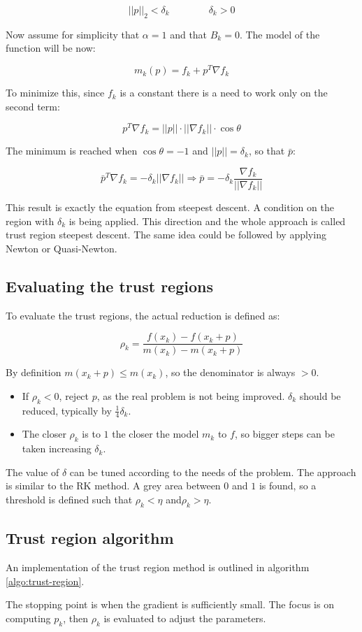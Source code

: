   $$||p||_2<\delta_k\qquad\qquad \delta_k > 0$$

  Now assume for simplicity that $\alpha = 1$ and that $B_k = 0$.
  The model of the function will be now:

  $$m_k(p) = f_k + p^T\nabla f_k$$

  To minimize this, since $f_k$ is a constant there is a need to work only on the second term:

  $$p^T\nabla f_k = ||p||\cdot||\nabla f_k||\cdot \cos\theta$$

  The minimum is reached when $\cos\theta = -1$ and $||p|| = \delta_k$, so that $\bar{p}$:

  $$\bar{p}^T\nabla f_k = -\delta_k||\nabla f_k||\Rightarrow \bar{p} = -\delta_k\frac{\nabla f_k}{||\nabla f_k||}$$

  This result is exactly the equation from steepest descent.
  A condition on the region with $\delta_k$ is being applied.
  This direction and the whole approach is called trust region steepest descent.
  The same idea could be followed by applying Newton or Quasi-Newton.

  \subsection{Evaluating the trust regions}
  To evaluate the trust regions, the actual reduction is defined as:

  $$\rho_k = \frac{f(x_k)-f(x_k+p)}{m(x_k)-m(x_k+p)}$$

  By definition $m(x_k+p) \leq m(x_k)$, so the denominator is always $>0$.

  \begin{multicols}{2}
    \begin{itemize}
      \item If $\rho_k < 0$, reject $p$, as the real problem is not being improved.
        $\delta_k$ should be reduced, typically by $\frac{1}{4} \delta_k$.
      \item The closer $\rho_k$ is to $1$ the closer the model $m_k$ to $f$, so bigger steps can be taken increasing $\delta_k$.
    \end{itemize}
  \end{multicols}

  The value of $\delta$ can be tuned according to the needs of the problem.
  The approach is similar to  the RK method.
  A grey area  between $0$ and $1$ is found, so a threshold is defined such that $\rho_k < \eta$ and$\rho_k > \eta$.


  \subsection{Trust region algorithm}
  An implementation of the trust region method is outlined in algorithm \ref{algo:trust-region}.

  

  The stopping point is when the gradient is sufficiently small.
  The focus is on computing $p_k$, then $\rho_k$ is evaluated to adjust the parameters.
